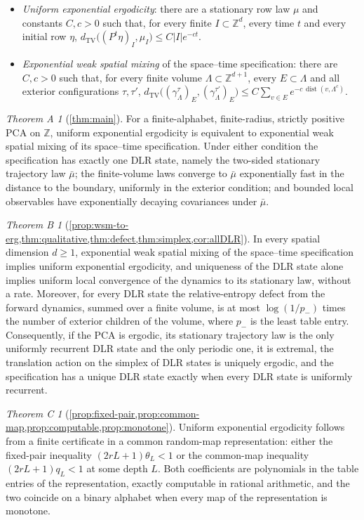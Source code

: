 \documentclass[11pt]{article}
\theoremstyle{plain}
\theoremstyle{definition}
\theoremstyle{remark}
\newtheorem*{mainA}{Theorem A}
\newtheorem*{mainB}{Theorem B}
\newtheorem*{mainC}{Theorem C}
\newcommand{\Z}{\mathbb{Z}}
\newcommand{\dtv}{d_{\mathrm{TV}}}
\newcommand{\Lam}{\Lambda}
\newcommand{\ba}{\bar{\mu}}
\newcommand{\dist}{\operatorname{dist}}
\begin{document}
\begin{itemize}
\item \emph{Uniform exponential ergodicity}: there are a stationary row law $\mu$ and constants $C,c>0$ such that, for every finite $I\subset\Z^d$, every time $t$ and every initial row $\eta$,
$\dtv\bigl((P^t\eta)_I,\mu_I\bigr)\le C|I|e^{-ct}$.
\item \emph{Exponential weak spatial mixing} of the space--time specification: there are $C,c>0$ such that, for every finite volume $\Lam\subset\Z^{d+1}$, every $E\subset\Lam$ and all exterior configurations $\tau,\tau'$,
$\dtv\bigl((\gamma^\tau_\Lam)_E,(\gamma^{\tau'}_\Lam)_E\bigr)\le C\sum_{v\in E}e^{-c\,\dist(v,\Lam^c)}$.
\end{itemize}

\begin{mainA}[\cref{thm:main}]
For a finite-alphabet, finite-radius, strictly positive PCA on $\Z$, uniform exponential ergodicity is equivalent to exponential weak spatial mixing of its space--time specification. Under either condition the specification has exactly one DLR state, namely the two-sided stationary trajectory law $\ba$; the finite-volume laws converge to $\ba$ exponentially fast in the distance to the boundary, uniformly in the exterior condition; and bounded local observables have exponentially decaying covariances under $\ba$.
\end{mainA}

\begin{mainB}[\cref{prop:wsm-to-erg,thm:qualitative,thm:defect,thm:simplex,cor:allDLR}]
In every spatial dimension $d\ge1$, exponential weak spatial mixing of the space--time specification implies uniform exponential ergodicity, and uniqueness of the DLR state alone implies uniform local convergence of the dynamics to its stationary law, without a rate. Moreover, for every DLR state the relative-entropy defect from the forward dynamics, summed over a finite volume, is at most $\log(1/p_-)$ times the number of exterior children of the volume, where $p_-$ is the least table entry. Consequently, if the PCA is ergodic, its stationary trajectory law is the only uniformly recurrent DLR state and the only periodic one, it is extremal, the translation action on the simplex of DLR states is uniquely ergodic, and the specification has a unique DLR state exactly when every DLR state is uniformly recurrent.
\end{mainB}

\begin{mainC}[\cref{prop:fixed-pair,prop:common-map,prop:computable,prop:monotone}]
Uniform exponential ergodicity follows from a finite certificate in a common random-map representation: either the fixed-pair inequality $(2rL+1)\theta_L<1$ or the common-map inequality $(2rL+1)q_L<1$ at some depth $L$. Both coefficients are polynomials in the table entries of the representation, exactly computable in rational arithmetic, and the two coincide on a binary alphabet when every map of the representation is monotone.
\end{mainC}
\end{document}
